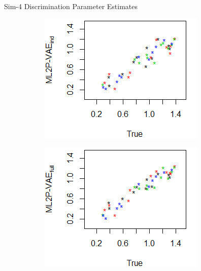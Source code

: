 \documentclass{beamer}
\theoremstyle{definition}
\begin{document}
\begin{frame}{Sim-4 Discrimination Parameter Estimates}
\begin{figure}[h]
\begin{subfigure}{.32\textwidth}
      \centering
      \includegraphics[width=.9\linewidth]{../img/ml_journal_results/4skills/vae_ind_disc_4skills_cropped.png}
    \end{subfigure}
    \begin{subfigure}{.32\textwidth}
      \centering
      \includegraphics[width=.9\linewidth]{../img/ml_journal_results/4skills/vae_full_disc_4skills_cropped.png}
    \end{subfigure}
    \begin{subfigure}{.32\textwidth}
      \centering

\end{subfigure}
\end{figure}
\end{frame}
\end{document}
